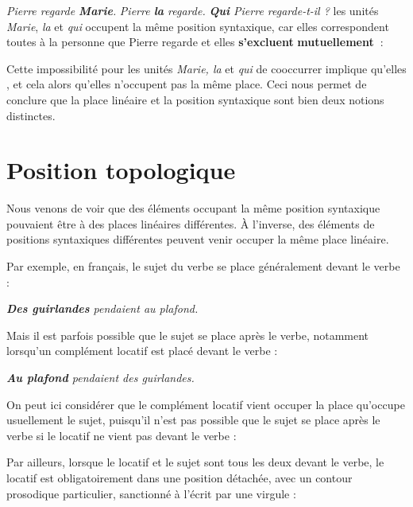 \ea
  \ea \textit{{Pierre regarde} \textbf{{Marie}}.}
  \ex \textit{{Pierre} \textbf{{la}}  {regarde.}}
  \ex \textit{\textbf{{Qui}}  {Pierre regarde-t-il} ?}
  \z
\z
les unités  \textit{Marie}, \textit{la} et \textit{qui} occupent la même position syntaxique, car elles correspondent toutes à la personne que Pierre regarde et elles \textbf{s’excluent} \textbf{mutuellement~}:

\ea
{}
\z
\z

Cette impossibilité pour les unités \textit{Marie, la} et \textit{qui} de cooccurrer implique qu’elles , et cela alors qu’elles n’occupent pas la même place. Ceci nous permet de conclure que la place linéaire et la position syntaxique sont bien deux notions distinctes.

\section{Position topologique}\label{sec:3.5.4}

Nous venons de voir que des éléments occupant la même position syntaxique pouvaient être à des places linéaires différentes. À l’inverse, des éléments de positions syntaxiques différentes peuvent venir occuper la même place linéaire.

Par exemple, en français, le sujet du verbe se place généralement devant le verbe :

\ea
\textit{\textbf{{Des guirlandes}}  {pendaient au plafond}.}
\z

Mais il est parfois possible que le sujet se place après le verbe, notamment lorsqu’un complément locatif est placé devant le verbe :

\ea
\textit{\textbf{{Au plafond}}  {pendaient des guirlandes}.}
\z

On peut ici considérer que le complément locatif vient occuper la place qu’occupe usuellement le sujet, puisqu’il n’est pas possible que le sujet se place après le verbe si le locatif ne vient pas devant le verbe :

\ea
{}
\z
\z

Par ailleurs, lorsque le locatif et le sujet sont tous les deux devant le verbe, le locatif est obligatoirement dans une position détachée, avec un contour prosodique particulier, sanctionné à l’écrit par une virgule :

